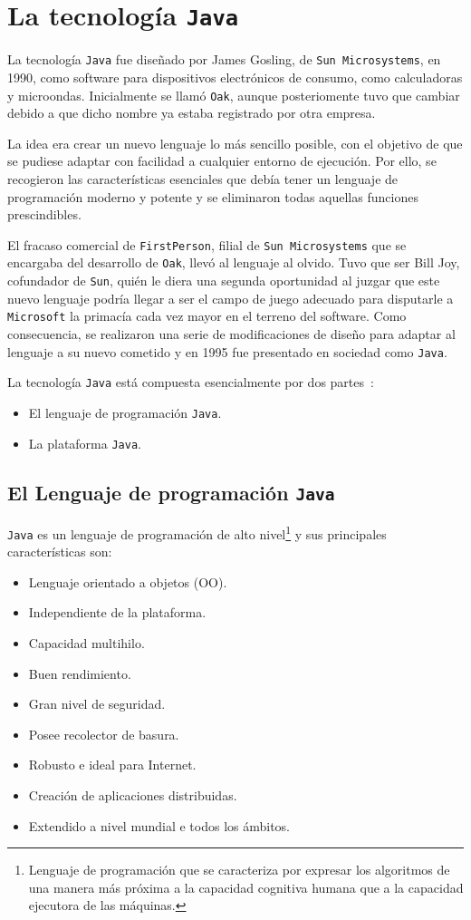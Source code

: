   \section{La tecnología \texttt{Java}}
  \label{subsec:java}
La tecnología \texttt{Java} fue diseñado por James Gosling, de \texttt{Sun 
Microsystems}, en 1990, como software para dispositivos electrónicos de
consumo, como calculadoras y microondas. Inicialmente se llamó \texttt{Oak},
aunque posteriomente tuvo que cambiar debido a que dicho nombre ya estaba
registrado por otra empresa.

La idea era crear un nuevo lenguaje lo más sencillo posible, con el objetivo
de que se pudiese adaptar con facilidad a cualquier entorno de ejecución. Por
ello, se recogieron las características esenciales que debía tener un lenguaje
de programación moderno y potente y se eliminaron todas aquellas funciones
prescindibles.

El fracaso comercial de \texttt{FirstPerson}, filial de \texttt{Sun
Microsystems} que se encargaba del desarrollo de \texttt{Oak}, llevó al
lenguaje al olvido. Tuvo que ser Bill Joy, cofundador de \texttt{Sun}, quién
le diera una segunda oportunidad al juzgar que este nuevo lenguaje podría
llegar a ser el campo de juego adecuado para disputarle a \texttt{Microsoft}
la primacía cada vez mayor en el terreno del software. Como consecuencia, se
realizaron una serie de modificaciones de diseño para adaptar al lenguaje
a su nuevo cometido y en 1995 fue presentado en sociedad como \texttt{Java}.

La tecnología \texttt{Java} está compuesta esencialmente por dos
partes~\cite{bib:java}:
\begin{itemize}
\item El lenguaje de programación \texttt{Java}.
\item La plataforma \texttt{Java}.
\end{itemize}

  \subsection{El Lenguaje de programación \texttt{Java}}
\texttt{Java} es un lenguaje de programación de alto nivel\footnote{Lenguaje
de programación que se caracteriza por expresar los algoritmos de una manera
más próxima a la capacidad cognitiva humana que a la capacidad ejecutora de
las máquinas.} y sus principales características son:
  \begin{itemize}
  \item Lenguaje orientado a objetos (\acs{OO}).
  \item Independiente de la plataforma.
  \item Capacidad multihilo.
  \item Buen rendimiento.
  \item Gran nivel de seguridad.
  \item Posee recolector de basura.
  \item Robusto e ideal para Internet.
  \item Creación de aplicaciones distribuidas.
  \item Extendido a nivel mundial e todos los ámbitos.
  \end{itemize}

